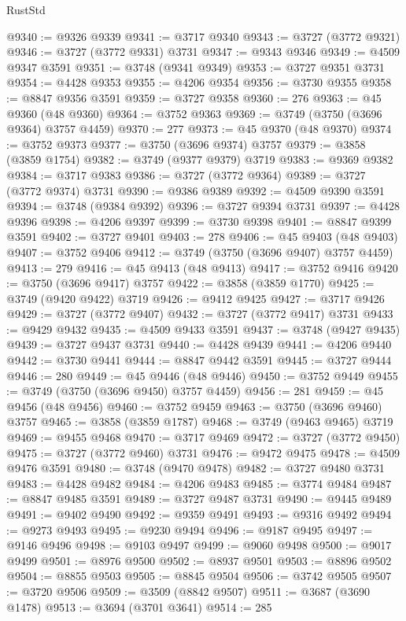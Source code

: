 \begin{lexlean}{RustStd}
\begin{coremodule}
@9340 := @9326 @9339
@9341 := @3717 @9340
@9343 := @3727 (@3772 @9321)
@9346 := @3727 (@3772 @9331) @3731
@9347 := @9343 @9346
@9349 := @4509 @9347 @3591
@9351 := @3748 (@9341 @9349)
@9353 := @3727 @9351 @3731
@9354 := @4428 @9353
@9355 := @4206 @9354
@9356 := @3730 @9355
@9358 := @8847 @9356 @3591
@9359 := @3727 @9358
@9360 := 276
@9363 := @45 @9360 (@48 @9360)
@9364 := @3752 @9363
@9369 := @3749 (@3750 (@3696 @9364) @3757 @4459)
@9370 := 277
@9373 := @45 @9370 (@48 @9370)
@9374 := @3752 @9373
@9377 := @3750 (@3696 @9374) @3757
@9379 := @3858 (@3859 @1754)
@9382 := @3749 (@9377 @9379) @3719
@9383 := @9369 @9382
@9384 := @3717 @9383
@9386 := @3727 (@3772 @9364)
@9389 := @3727 (@3772 @9374) @3731
@9390 := @9386 @9389
@9392 := @4509 @9390 @3591
@9394 := @3748 (@9384 @9392)
@9396 := @3727 @9394 @3731
@9397 := @4428 @9396
@9398 := @4206 @9397
@9399 := @3730 @9398
@9401 := @8847 @9399 @3591
@9402 := @3727 @9401
@9403 := 278
@9406 := @45 @9403 (@48 @9403)
@9407 := @3752 @9406
@9412 := @3749 (@3750 (@3696 @9407) @3757 @4459)
@9413 := 279
@9416 := @45 @9413 (@48 @9413)
@9417 := @3752 @9416
@9420 := @3750 (@3696 @9417) @3757
@9422 := @3858 (@3859 @1770)
@9425 := @3749 (@9420 @9422) @3719
@9426 := @9412 @9425
@9427 := @3717 @9426
@9429 := @3727 (@3772 @9407)
@9432 := @3727 (@3772 @9417) @3731
@9433 := @9429 @9432
@9435 := @4509 @9433 @3591
@9437 := @3748 (@9427 @9435)
@9439 := @3727 @9437 @3731
@9440 := @4428 @9439
@9441 := @4206 @9440
@9442 := @3730 @9441
@9444 := @8847 @9442 @3591
@9445 := @3727 @9444
@9446 := 280
@9449 := @45 @9446 (@48 @9446)
@9450 := @3752 @9449
@9455 := @3749 (@3750 (@3696 @9450) @3757 @4459)
@9456 := 281
@9459 := @45 @9456 (@48 @9456)
@9460 := @3752 @9459
@9463 := @3750 (@3696 @9460) @3757
@9465 := @3858 (@3859 @1787)
@9468 := @3749 (@9463 @9465) @3719
@9469 := @9455 @9468
@9470 := @3717 @9469
@9472 := @3727 (@3772 @9450)
@9475 := @3727 (@3772 @9460) @3731
@9476 := @9472 @9475
@9478 := @4509 @9476 @3591
@9480 := @3748 (@9470 @9478)
@9482 := @3727 @9480 @3731
@9483 := @4428 @9482
@9484 := @4206 @9483
@9485 := @3774 @9484
@9487 := @8847 @9485 @3591
@9489 := @3727 @9487 @3731
@9490 := @9445 @9489
@9491 := @9402 @9490
@9492 := @9359 @9491
@9493 := @9316 @9492
@9494 := @9273 @9493
@9495 := @9230 @9494
@9496 := @9187 @9495
@9497 := @9146 @9496
@9498 := @9103 @9497
@9499 := @9060 @9498
@9500 := @9017 @9499
@9501 := @8976 @9500
@9502 := @8937 @9501
@9503 := @8896 @9502
@9504 := @8855 @9503
@9505 := @8845 @9504
@9506 := @3742 @9505
@9507 := @3720 @9506
@9509 := @3509 (@8842 @9507)
@9511 := @3687 (@3690 @1478)
@9513 := @3694 (@3701 @3641)
@9514 := 285

\end{coremodule}
\end{lexlean}
